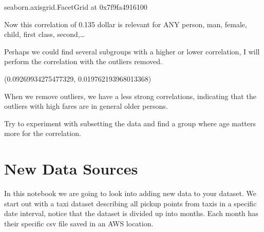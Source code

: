 \documentclass[letterpaper,10pt,english]{jupyterBook}
\begin{document}
\begin{sphinxVerbatim}[commandchars=\\\{\}]
\PYGZlt{}seaborn.axisgrid.FacetGrid at 0x7f9fa4916100\PYGZgt{}
\end{sphinxVerbatim}

\noindent{}

\sphinxAtStartPar
Now this correlation of 0.135 dollar is relevant for ANY person, man, female, child, first class, second,…

\sphinxAtStartPar
Perhaps we could find several subgroups with a higher or lower correlation, I will perform the correlation with the outliers removed.

\begin{sphinxVerbatim}[commandchars=\\\{\}]
   \PYG{p}{[}\PYG{p}{]}\PYG{p}{[}\PYG{p}{[}\PYG{p}{]}\PYG{p}{]}
 
\end{sphinxVerbatim}

\begin{sphinxVerbatim}[commandchars=\\\{\}]
(0.09269934275477329, 0.019762193968013368)
\end{sphinxVerbatim}

\sphinxAtStartPar
When we remove outliers, we have a less strong correlations, indicating that the outliers \sphinxhyphen{} with high fares \sphinxhyphen{} are in general older persons.

\sphinxAtStartPar
Try to experiment with subsetting the data and find a group where age matters more for the correlation.


\chapter{New Data Sources}
\label{\detokenize{c5_data_exploration/external_data:new-data-sources}}\label{\detokenize{c5_data_exploration/external_data::doc}}
\sphinxAtStartPar
In this notebook we are going to look into adding new data to your dataset.
We start out with a taxi dataset describing all pickup points from taxis in a specific date interval, notice that the dataset is divided up into months. Each month has their specific csv file saved in an AWS location.
\end{document}
